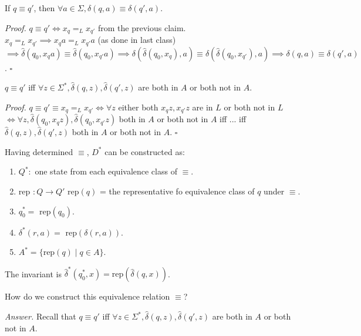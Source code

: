 \documentclass[a4paper]{article}
\newenvironment{proof}{\begin{breakbox}\textit{Proof.}}{\hfill$\square$\end{breakbox}}
\newenvironment{ans}{\begin{breakbox}\textit{Answer.}}{\end{breakbox}}
\newcommand{\nl}{\vspace{0.2cm}\\}
\newcommand{\hd}{\hat{\delta}}
\begin{document}
\begin{claim}
    If $q \equiv q'$, then $\forall a \in \Sigma, \delta(q, a) \equiv \delta(q', a)$.
\end{claim}

\begin{proof}
    $q \equiv q' \iff x_q =_L x_{q'}$ from the previous claim.\nl
    $x_q =_L x_{q'} \implies x_q a =_L x_{q'} a$ (as done in last class) $\implies \hd(q_0, x_qa) \equiv \hd(q_0, x_{q'}a) \implies \delta(\hd(q_0, x_q), a) \equiv \delta(\hd(q_0, x_{q'}), a)
    \implies \delta(q, a) \equiv \delta(q', a)$.
\end{proof}

\begin{claim}
    $q \equiv q'$ iff $\forall z \in \Sigma^*, \hd(q, z), \hd(q', z)$ are both in $A$ or both not in $A$.
\end{claim}

\begin{proof}
    $q \equiv q' \equiv x_q =_L x_{q'} \iff \forall z$ either both $x_q z, x_{q'}z$ are in $L$ or both not in $L$ $\iff \forall z, \hd(q_0, x_qz), \hd(q_0, x_{q'}z)$ both in $A$ or both not in $A$
        iff ... iff $\hd(q, z), \hd(q', z)$ both in $A$ or both not in $A$.
\end{proof}

Having determined $\equiv$, $D^*$ can be constructed as:

\begin{enumerate}
    \item $Q^*:$ one state from each equivalence class of $\equiv$.
    \item rep $: Q \to Q'$ rep$(q)$ = the representative fo equivalence class of $q$ under $\equiv$.
    \item $q_0^* = $ rep$(q_0)$.
    \item $\delta^*(r, a) = $ rep$(\delta(r, a))$.
    \item $A^* = \{\mathrm{rep}(q) \mid q \in A\}$.
\end{enumerate}

The invariant is $\hd^*(q_0^*, x) = \mathrm{rep}(\hd(q, x))$.

\begin{ques}
    How do we construct this equivalence relation $\equiv$?
\end{ques}

\begin{ans}
    Recall that $q \equiv q'$ iff $\forall z \in \Sigma^*, \hd(q, z), \hd(q', z)$ are both in $A$ or both not in $A$.
\end{ans}
\end{document}
